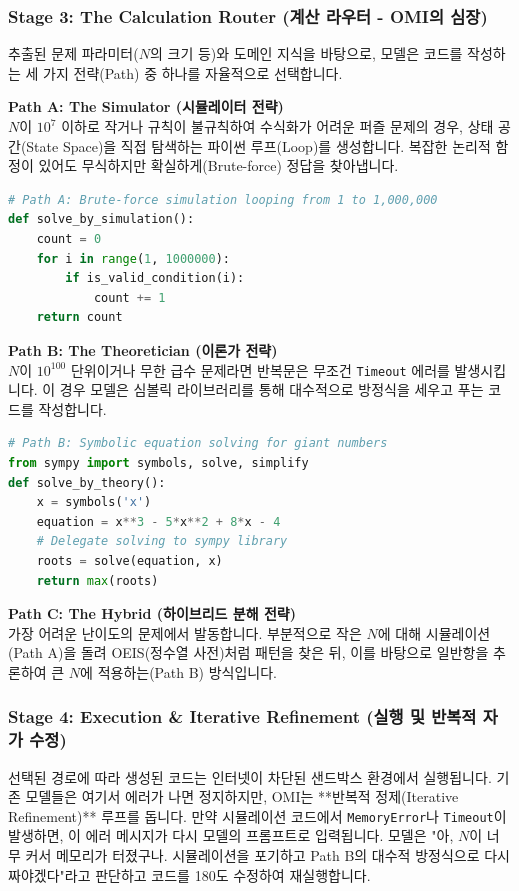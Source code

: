 \subsubsection{Stage 3: The Calculation Router (계산 라우터 - OMI의 심장)}
추출된 문제 파라미터($N$의 크기 등)와 도메인 지식을 바탕으로, 모델은 코드를 작성하는 세 가지 전략(Path) 중 하나를 자율적으로 선택합니다.

\vspace{0.3cm}
\noindent\textbf{Path A: The Simulator (시뮬레이터 전략)} \\
$N$이 $10^7$ 이하로 작거나 규칙이 불규칙하여 수식화가 어려운 퍼즐 문제의 경우, 상태 공간(State Space)을 직접 탐색하는 파이썬 루프(Loop)를 생성합니다. 복잡한 논리적 함정이 있어도 무식하지만 확실하게(Brute-force) 정답을 찾아냅니다.
\begin{lstlisting}[language=Python]
# Path A: Brute-force simulation looping from 1 to 1,000,000
def solve_by_simulation():
    count = 0
    for i in range(1, 1000000):
        if is_valid_condition(i):
            count += 1
    return count
\end{lstlisting}

\noindent\textbf{Path B: The Theoretician (이론가 전략)} \\
$N$이 $10^{100}$ 단위이거나 무한 급수 문제라면 반복문은 무조건 \texttt{Timeout} 에러를 발생시킵니다. 이 경우 모델은 심볼릭 라이브러리를 통해 대수적으로 방정식을 세우고 푸는 코드를 작성합니다.
\begin{lstlisting}[language=Python]
# Path B: Symbolic equation solving for giant numbers
from sympy import symbols, solve, simplify
def solve_by_theory():
    x = symbols('x')
    equation = x**3 - 5*x**2 + 8*x - 4
    # Delegate solving to sympy library
    roots = solve(equation, x) 
    return max(roots)
\end{lstlisting}

\noindent\textbf{Path C: The Hybrid (하이브리드 분해 전략)} \\
가장 어려운 난이도의 문제에서 발동합니다. 부분적으로 작은 $N$에 대해 시뮬레이션(Path A)을 돌려 OEIS(정수열 사전)처럼 패턴을 찾은 뒤, 이를 바탕으로 일반항을 추론하여 큰 $N$에 적용하는(Path B) 방식입니다.

\subsubsection{Stage 4: Execution \& Iterative Refinement (실행 및 반복적 자가 수정)}
선택된 경로에 따라 생성된 코드는 인터넷이 차단된 샌드박스 환경에서 실행됩니다. 
기존 모델들은 여기서 에러가 나면 정지하지만, OMI는 **반복적 정제(Iterative Refinement)** 루프를 돕니다. 만약 시뮬레이션 코드에서 \texttt{MemoryError}나 \texttt{Timeout}이 발생하면, 이 에러 메시지가 다시 모델의 프롬프트로 입력됩니다. 모델은 "아, $N$이 너무 커서 메모리가 터졌구나. 시뮬레이션을 포기하고 Path B의 대수적 방정식으로 다시 짜야겠다"라고 판단하고 코드를 180도 수정하여 재실행합니다.

